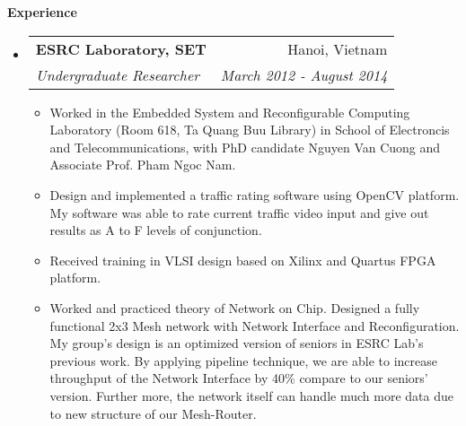 \documentclass[a4paper,11pt]{article}
\makeatletter
\newcommand{\resitem}[1]{\item #1 \vspace{-2pt}}
\newcommand{\resheading}[1]{{\large \colorbox{mygrey}{\begin{minipage}{\textwidth}{\textbf{#1 \vphantom{p\^{E}}}}\end{minipage}}}}
\newcommand{\ressubheading}[4]{
\begin{tabular*}{6.5in}{l@{\extracolsep{\fill}}r}
		\textbf{#1} & #2 \\
		\textit{#3} & \textit{#4} \\
\end{tabular*}\vspace{-6pt}}
\makeatother
\begin{document}

\resheading{Experience}
\begin{itemize}
\item
	\ressubheading{ESRC Laboratory, SET}{Hanoi, Vietnam}{Undergraduate Researcher}{March 2012 - August 2014}
	\begin{itemize}
		\resitem{Worked in the Embedded System and Reconfigurable Computing Laboratory (Room 618, Ta Quang Buu Library) in School of Electroncis and Telecommunications, with PhD candidate Nguyen Van Cuong and Associate Prof. Pham Ngoc Nam.}
		\resitem{Design and implemented a traffic rating software using OpenCV platform. My software was able to rate current traffic video input and give out results as A to F levels of conjunction.}
		\resitem{Received training in VLSI design based on Xilinx and Quartus FPGA platform.}
		\resitem{Worked and practiced theory of Network on Chip. Designed a fully functional 2x3 Mesh network with Network Interface and Reconfiguration. My group's design is an optimized version of seniors in ESRC Lab's previous work. By applying pipeline technique, we are able to increase throughput of the Network Interface by 40\% compare to our seniors' version. Further more, the network itself can handle much more data due to new structure of our Mesh-Router.}
	\end{itemize}


\end{itemize}
\end{document}
